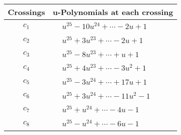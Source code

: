 \documentclass[1p]{elsarticle_modified}
\theoremstyle{definition}
\begin{document}
\begin{tabular}{m{50pt}|m{274pt}}
Crossings & \hspace{64pt}u-Polynomials at each crossing \\
\hline $$\begin{aligned}c_{1}\end{aligned}$$&$\begin{aligned}
&u^{25}-10 u^{24}+\cdots-2 u+1
\end{aligned}$\\
\hline $$\begin{aligned}c_{2}\end{aligned}$$&$\begin{aligned}
&u^{25}+3 u^{23}+\cdots-2 u+1
\end{aligned}$\\
\hline $$\begin{aligned}c_{3}\end{aligned}$$&$\begin{aligned}
&u^{25}-8 u^{23}+\cdots+u+1
\end{aligned}$\\
\hline $$\begin{aligned}c_{4}\end{aligned}$$&$\begin{aligned}
&u^{25}+4 u^{23}+\cdots-3 u^2+1
\end{aligned}$\\
\hline $$\begin{aligned}c_{5}\end{aligned}$$&$\begin{aligned}
&u^{25}-3 u^{24}+\cdots+17 u+1
\end{aligned}$\\
\hline $$\begin{aligned}c_{6}\end{aligned}$$&$\begin{aligned}
&u^{25}+3 u^{24}+\cdots-11 u^2-1
\end{aligned}$\\
\hline $$\begin{aligned}c_{7}\end{aligned}$$&$\begin{aligned}
&u^{25}+u^{24}+\cdots-4 u-1
\end{aligned}$\\
\hline $$\begin{aligned}c_{8}\end{aligned}$$&$\begin{aligned}
&u^{25}- u^{24}+\cdots-6 u-1
\end{aligned}$\\

\end{tabular}
\end{document}
